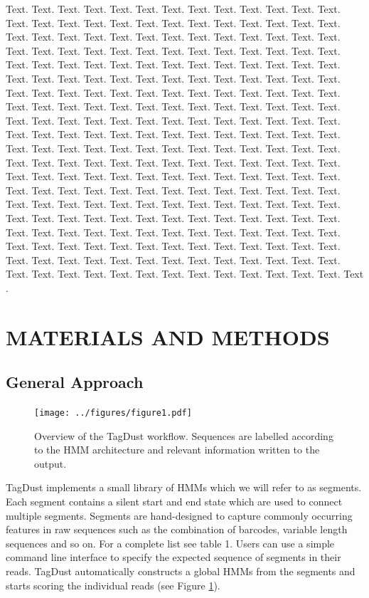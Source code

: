 \documentclass[a4,center,fleqn]{NAR}
\begin{document}
Text. Text. Text. Text. Text. Text. Text. Text. Text. Text. Text.
Text. Text. Text. Text. Text. Text. Text. Text. Text. Text. Text.
Text. Text. Text. Text. Text. Text. Text. Text. Text. Text. Text.
Text. Text. Text. Text. Text. Text. Text. Text. Text. Text. Text.
Text. Text. Text. Text. Text. Text. Text. Text. Text. Text. Text.
Text. Text. Text. Text. Text. Text. Text. Text. Text. Text. Text.
Text. Text. Text. Text. Text. Text. Text. Text. Text. Text. Text.
Text. Text. Text. Text. Text. Text. Text. Text. Text. Text. Text.
Text. Text. Text. Text. Text. Text. Text. Text. Text. Text. Text.
Text. Text. Text. Text. Text. Text. Text. Text. Text. Text.
Text. Text. Text. Text. Text. Text. Text. Text. Text. Text. Text.
Text. Text. Text. Text. Text. Text. Text. Text. Text. Text. Text.
Text. Text. Text. Text. Text. Text. Text. Text. Text. Text. Text.
Text. Text. Text. Text. Text. Text. Text. Text. Text. Text. Text.
Text. Text. Text. Text. Text. Text. Text. Text. Text. Text. Text.
Text. Text. Text. Text. Text. Text. Text. Text. Text. Text. Text.
Text. Text. Text. Text. Text. Text. Text. Text. Text. Text. Text.
Text. Text. Text. Text. Text. Text. Text. Text. Text. Text. Text.
Text. Text. Text. Text. Text. Text. Text. Text. Text. Text. Text.
Text. Text. Text. Text. Text. Text. Text. Text. Text. Text. Text.
Text. Text. Text. Text. Text. Text. Text. Text. Text. Text. Text.
Text. Text. Text. Text. Text. Text. Text. Text. Text. Text. Text.
Text. Text. Text. Text. Text. Text. Text. Text. Text. Text. Text.
Text. Text. Text. Text. Text. Text. Text. Text.
Text \cite{4}.

\section{MATERIALS AND METHODS}

\subsection{General Approach}

\begin{figure}[t]
\begin{center}
\texttt{[image: ../figures/figure1.pdf]}
\end{center}
\caption{Overview of the TagDust workflow. Sequences are labelled according to the HMM architecture and relevant information written to the output. 
}
\label{figure1}
\end{figure}

TagDust implements a small library of HMMs which we will refer to as segments. Each segment contains a silent start and end state which are used to connect multiple segments. Segments are hand-designed to capture commonly occurring features in raw sequences such as the combination of barcodes, variable length sequences and so on. For a complete list see table 1. Users can use a simple command line interface to specify the expected sequence of segments in their reads. TagDust automatically constructs a global HMMs from the segments and starts scoring the individual reads (see Figure \ref{figure1}). 
\end{document}
